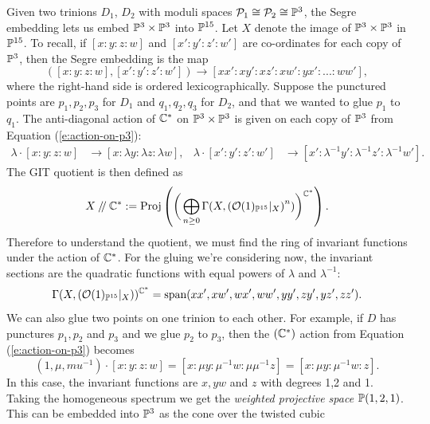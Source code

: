 	Given two trinions $D_1$, $D_2$ with moduli spaces $\mathcal{P}_1 \cong \mathcal{P}_2 \cong \mathbb{P}^3$, the Segre embedding lets us embed $\mathbb{P}^3 \times \mathbb{P}^3$ into $\mathbb{P}^{15}$. Let $X$ denote the image of $\mathbb{P}^3 \times \mathbb{P}^3$ in $\mathbb{P}^{15}$. To recall, if $[x:y:z:w]$ and $[x':y':z':w']$ are co-ordinates for each copy of $\mathbb{P}^3$, then the Segre embedding is the map
	\begin{equation}
	\label{e:segre}
	([x:y:z:w], [x':y':z':w']) \to [xx':xy':xz':xw':yx':...:ww'],
	\end{equation}
	where the right-hand side is ordered lexicographically. Suppose the punctured points are ${p_1,p_2,p_3}$ for $D_1$ and ${q_1,q_2,q_3}$ for $D_2$, and that we wanted to glue $p_1$ to $q_1$. The anti-diagonal action of $\mathbb{C}^\ast$ on $\mathbb{P}^3\times \mathbb{P}^3$ is given on each copy of $\mathbb{P}^3$ from Equation (\ref{e:action-on-p3}):
	\begin{align*}
		\lambda \cdot [x:y:z:w] &\to [x:\lambda y:\lambda z:\lambda w], & \lambda \cdot [x':y':z':w'] &\to [x':\lambda^{-1} y':\lambda^{-1} z':\lambda^{-1}w'].
	\end{align*}
	The GIT quotient is then defined as
	\begin{equation}
	X\mathbin{/\mkern-4mu/} \mathbb{C}^\ast := \text{Proj}\left(\bigg(\bigoplus_{n\geq 0} \Gamma(X, \left(\mathcal{O}(1)_{\mathbb{P}^{15}}|_X\right)^n)\bigg)^{\mathbb{C}^\ast}\right).
	\end{equation}
	Therefore to understand the quotient, we must find the ring of invariant functions under the action of $\mathbb{C}^\ast$. For the gluing we're considering now, the invariant sections are the quadratic functions with equal powers of $\lambda$ and $\lambda^{-1}$:
	\begin{equation}
		\Gamma(X, \left(\mathcal{O}(1)_{\mathbb{P}^{15}}|_X\right))^{\mathbb{C}^\ast} = \text{span}(xx',xw',wx',ww',yy',zy',yz',zz').
	\end{equation}
	We can also glue two points on one trinion to each other. For example, if $D$ has punctures $p_1,p_2$ and $p_3$ and we glue $p_2$ to $p_3$, then the $(\mathbb{C}^\ast)$ action from Equation (\ref{e:action-on-p3}) becomes
	\begin{equation}
		(1,\mu, mu^{-1})\cdot [x:y:z:w] = [x:\mu y: \mu^{-1}w: \mu\mu^{-1}z] = [x:\mu y:\mu^{-1}w:z].
	\end{equation}
	In this case, the invariant functions are $x,yw$ and $z$ with degrees 1,2 and 1. Taking the homogeneous spectrum we get the \emph{weighted projective space} $\mathbb{P}(1,2,1)$. This can be embedded into $\mathbb{P}^3$ as the cone over the twisted cubic \cite[Ex. 1.1]{reid_graded_2002}
		

